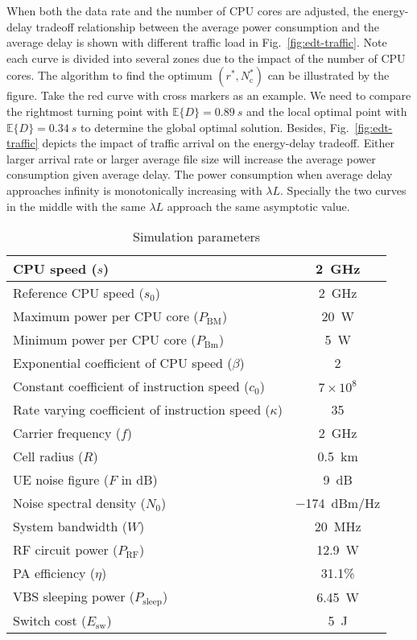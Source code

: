 \documentclass[conference]{IEEEtran}
\newcommand{\E}[1]{\mathbb{E}\{#1\}}
\begin{document}
When both the data rate and the number of CPU cores are adjusted, the
energy-delay tradeoff relationship
between the average power consumption and the average delay is shown with
different traffic load in Fig.~\ref{fig:edt-traffic}. Note
each curve is divided into several zones due to the impact of the number
of CPU cores. The algorithm to find the optimum
$(r^*, N_\text{c}^*)$ can be illustrated by the figure.
Take the red curve with cross markers
as an example. We need to compare the
rightmost turning point with $\E{D}=\SI{0.89}{s}$ and the local optimal point
with $\E{D} = \SI{0.34}{s}$
to determine the global optimal solution.
Besides, Fig.~\ref{fig:edt-traffic} depicts the impact of traffic
arrival on the energy-delay tradeoff.
Either larger arrival rate or larger average file size will increase
the average power consumption given average delay. The power consumption when
average delay approaches infinity is monotonically increasing with $\lambda L$.
Specially the two curves in the middle
with the same $\lambda L$ approach the same asymptotic value.

\begin{table}[!t]
  \renewcommand{\arraystretch}{1.3}
  \caption{Simulation parameters}
  \label{tab:edt}
  \centering
  \begin{tabular}{lc}
    \hline
    CPU speed ($s$) & \SI{2}{GHz} \\
    \hline
    Reference CPU speed ($s_0$) & \SI{2}{GHz} \\
    \hline
    Maximum power per CPU core ($P_\text{BM}$) & \SI{20}{W} \\
    \hline
    Minimum power per CPU core ($P_\text{Bm}$) & \SI{5}{W} \\
    \hline
    Exponential coefficient of CPU speed ($\beta$) & 2 \\
    \hline
    Constant coefficient of instruction speed ($c_0$) & $7\times10^8$ \\
    \hline
    Rate varying coefficient of instruction speed ($\kappa$) & 35 \\
    \hline
    Carrier frequency ($f$) & \SI{2}{GHz} \\
    \hline
    Cell radius ($R$) & \SI{0.5}{km} \\
    \hline
    UE noise figure ($F$ in \si{dB}) & \SI{9}{dB} \\
    \hline
    Noise spectral density ($N_0$) & \SI{-174}{dBm/Hz} \\
    \hline
    System bandwidth ($W$) & \SI{20}{MHz} \\
    \hline
    RF circuit power ($P_\text{RF}$) & \SI{12.9}{W} \\
    \hline
    PA efficiency ($\eta$) & 31.1\% \\
    \hline
    VBS sleeping power ($P_\text{sleep}$) & \SI{6.45}{W} \\
    \hline
    Switch cost ($E_\text{sw}$) & \SI{5}{J} \\
    \hline
  \end{tabular}
\end{table}
\end{document}
